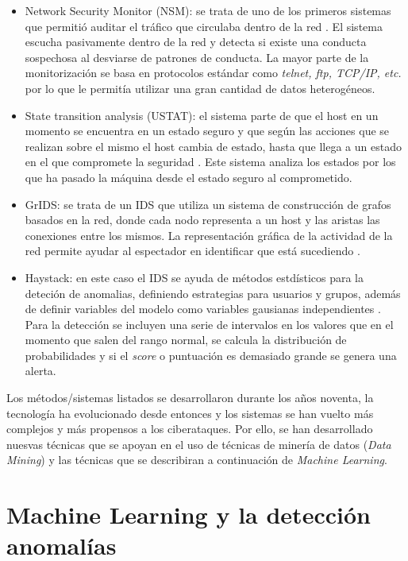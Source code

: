 \begin{itemize}
    \item Network Security Monitor (NSM):  se trata de uno de los primeros sistemas que permitió auditar el tráfico que circulaba dentro de la red \cite{surveyIDS}. El sistema escucha pasivamente dentro de la red y detecta si existe una conducta sospechosa al desviarse de patrones de conducta. La mayor parte de la monitorización se basa en protocolos estándar como \textit{telnet, ftp, TCP/IP, etc.} por lo que le permitía utilizar una gran cantidad de datos heterogéneos.
    \item State transition analysis (USTAT): el sistema parte de que el host en un momento se encuentra en un estado seguro y que según las acciones que se realizan sobre el mismo el host cambia de estado, hasta que llega a un estado en el que compromete la seguridad \cite{surveyIDS}. Este sistema analiza los estados por los que ha pasado la máquina desde el estado seguro al comprometido. 
    \item GrIDS: se trata de un IDS que utiliza un sistema de construcción de grafos basados en la red, donde cada nodo representa a un host y las aristas las conexiones entre los mismos. La representación gráfica de la actividad de la red permite ayudar al espectador en identificar que está sucediendo \cite{surveyIDS}.
    \item Haystack: en este caso el IDS se ayuda de métodos estdísticos para la deteción de anomalias, definiendo estrategias para usuarios y grupos, además de definir variables del modelo como variables gausianas independientes \cite{garcia2009anomaly}. Para la detección se incluyen una serie de intervalos en los valores que en el momento que salen del rango normal, se calcula la distribución de probabilidades y si el \textit{score} o puntuación es demasiado grande se genera una alerta.
\end{itemize}

Los métodos/sistemas listados se desarrollaron durante los años noventa, la tecnología ha evolucionado desde entonces y los sistemas se han vuelto más complejos y más propensos a los ciberataques. Por ello, se han desarrollado nuesvas técnicas que se apoyan en el uso de técnicas de minería de datos (\textit{Data Mining}) y las técnicas que se describiran a continuación de \textit{Machine Learning}.

\section{Machine Learning y la detección anomalías}